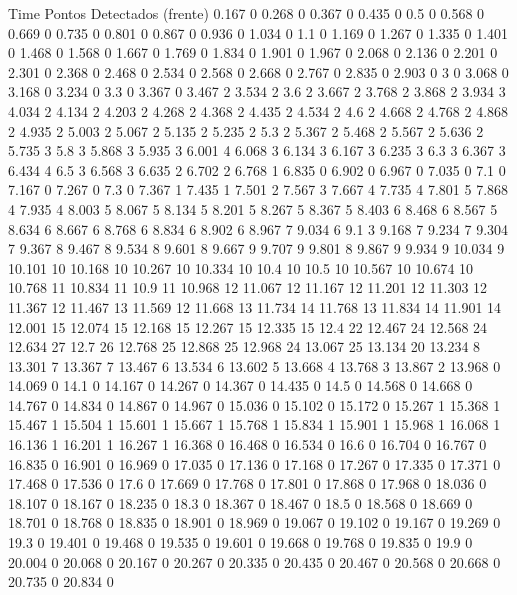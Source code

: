 Time	Pontos Detectados (frente)
0.167	0
0.268	0
0.367	0
0.435	0
0.5	0
0.568	0
0.669	0
0.735	0
0.801	0
0.867	0
0.936	0
1.034	0
1.1	0
1.169	0
1.267	0
1.335	0
1.401	0
1.468	0
1.568	0
1.667	0
1.769	0
1.834	0
1.901	0
1.967	0
2.068	0
2.136	0
2.201	0
2.301	0
2.368	0
2.468	0
2.534	0
2.568	0
2.668	0
2.767	0
2.835	0
2.903	0
3	0
3.068	0
3.168	0
3.234	0
3.3	0
3.367	0
3.467	2
3.534	2
3.6	2
3.667	2
3.768	2
3.868	2
3.934	3
4.034	2
4.134	2
4.203	2
4.268	2
4.368	2
4.435	2
4.534	2
4.6	2
4.668	2
4.768	2
4.868	2
4.935	2
5.003	2
5.067	2
5.135	2
5.235	2
5.3	2
5.367	2
5.468	2
5.567	2
5.636	2
5.735	3
5.8	3
5.868	3
5.935	3
6.001	4
6.068	3
6.134	3
6.167	3
6.235	3
6.3	3
6.367	3
6.434	4
6.5	3
6.568	3
6.635	2
6.702	2
6.768	1
6.835	0
6.902	0
6.967	0
7.035	0
7.1	0
7.167	0
7.267	0
7.3	0
7.367	1
7.435	1
7.501	2
7.567	3
7.667	4
7.735	4
7.801	5
7.868	4
7.935	4
8.003	5
8.067	5
8.134	5
8.201	5
8.267	5
8.367	5
8.403	6
8.468	6
8.567	5
8.634	6
8.667	6
8.768	6
8.834	6
8.902	6
8.967	7
9.034	6
9.1	3
9.168	7
9.234	7
9.304	7
9.367	8
9.467	8
9.534	8
9.601	8
9.667	9
9.707	9
9.801	8
9.867	9
9.934	9
10.034	9
10.101	10
10.168	10
10.267	10
10.334	10
10.4	10
10.5	10
10.567	10
10.674	10
10.768	11
10.834	11
10.9	11
10.968	12
11.067	12
11.167	12
11.201	12
11.303	12
11.367	12
11.467	13
11.569	12
11.668	13
11.734	14
11.768	13
11.834	14
11.901	14
12.001	15
12.074	15
12.168	15
12.267	15
12.335	15
12.4	22
12.467	24
12.568	24
12.634	27
12.7	26
12.768	25
12.868	25
12.968	24
13.067	25
13.134	20
13.234	8
13.301	7
13.367	7
13.467	6
13.534	6
13.602	5
13.668	4
13.768	3
13.867	2
13.968	0
14.069	0
14.1	0
14.167	0
14.267	0
14.367	0
14.435	0
14.5	0
14.568	0
14.668	0
14.767	0
14.834	0
14.867	0
14.967	0
15.036	0
15.102	0
15.172	0
15.267	1
15.368	1
15.467	1
15.504	1
15.601	1
15.667	1
15.768	1
15.834	1
15.901	1
15.968	1
16.068	1
16.136	1
16.201	1
16.267	1
16.368	0
16.468	0
16.534	0
16.6	0
16.704	0
16.767	0
16.835	0
16.901	0
16.969	0
17.035	0
17.136	0
17.168	0
17.267	0
17.335	0
17.371	0
17.468	0
17.536	0
17.6	0
17.669	0
17.768	0
17.801	0
17.868	0
17.968	0
18.036	0
18.107	0
18.167	0
18.235	0
18.3	0
18.367	0
18.467	0
18.5	0
18.568	0
18.669	0
18.701	0
18.768	0
18.835	0
18.901	0
18.969	0
19.067	0
19.102	0
19.167	0
19.269	0
19.3	0
19.401	0
19.468	0
19.535	0
19.601	0
19.668	0
19.768	0
19.835	0
19.9	0
20.004	0
20.068	0
20.167	0
20.267	0
20.335	0
20.435	0
20.467	0
20.568	0
20.668	0
20.735	0
20.834	0
